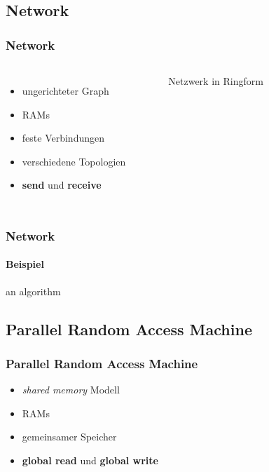 \subsection{Network}
\begin{frame}
    \frametitle{Network}
    \begin{columns}
        \begin{itemize}
            \item ungerichteter Graph
            \item RAMs
            \item feste Verbindungen
            \item verschiedene Topologien
            \item \textbf{send} und \textbf{receive}
        \end{itemize}
        \begin{figure}
            \centering
            
            \caption{Netzwerk in Ringform}
        \end{figure}
    \end{columns}
\end{frame}

\begin{frame}
    \frametitle{Network}
    \framesubtitle{Beispiel}
    an algorithm
\end{frame}

\subsection{Parallel Random Access Machine}
\begin{frame}
    \frametitle{Parallel Random Access Machine}
    \begin{itemize}
        \item \emph{shared memory} Modell
        \item RAMs
        \item gemeinsamer Speicher
        \item \textbf{global read} und \textbf{global write}
    \end{itemize}
\end{frame}

